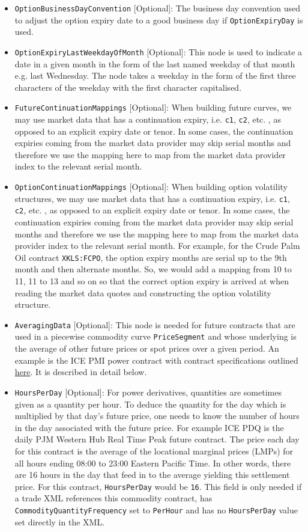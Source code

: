 \begin{itemize}
\item \lstinline!OptionBusinessDayConvention! [Optional]: The business day convention used to adjust the option expiry date to a good business day if \lstinline!OptionExpiryDay! is used.
\item \lstinline!OptionExpiryLastWeekdayOfMonth! [Optional]: This node is used to indicate a date in a given month in the form of the last named weekday of that month e.g. last Wednesday. The node takes a weekday in the form of the first three characters of the weekday with the first character capitalised.
\item \lstinline!FutureContinuationMappings! [Optional]: When building future curves, we may use market data that has a continuation expiry, i.e. \lstinline!c1!, \lstinline!c2!, etc. , as opposed to an explicit expiry date or tenor. In some cases, the continuation expiries coming from the market data provider may skip serial months and therefore we use the mapping here to map from the market data provider index to the relevant serial month.
\item \lstinline!OptionContinuationMappings! [Optional]: When building option volatility structures, we may use market data that has a continuation expiry, i.e. \lstinline!c1!, \lstinline!c2!, etc. , as opposed to an explicit expiry date or tenor. In some cases, the continuation expiries coming from the market data provider may skip serial months and therefore we use the mapping here to map from the market data provider index to the relevant serial month. For example, for the Crude Palm Oil contract \lstinline!XKLS:FCPO!, the option expiry months are serial up to the 9th month and then alternate months. So, we would add a mapping from 10 to 11, 11 to 13 and so on so that the correct option expiry is arrived at when reading the market data quotes and constructing the option volatility structure.
\item \lstinline!AveragingData! [Optional]: This node is needed for future contracts that are used in a piecewise commodity curve \lstinline!PriceSegment! and whose underlying is the average of other future prices or spot prices over a given period. An example is the ICE PMI power contract with contract specifications outlined \href{https://www.theice.com/products/6590369/PJM-Western-Hub-Real-Time-Peak-1-MW-Fixed-Price-Future}{here}. It is described in detail below.
\item \lstinline!HoursPerDay! [Optional]: For power derivatives, quantities are sometimes given as a quantity per hour. To deduce the quantity for the day which is multiplied by that day's future price, one needs to know the number of hours in the day associated with the future price. For example ICE PDQ is the daily PJM Western Hub Real Time Peak future contract. The price each day for this contract is the average of the locational marginal prices (LMPs) for all hours ending 08:00 to 23:00 Eastern Pacific Time. In other words, there are 16 hours in the day that feed in to the average yielding this settlement price. For this contract, \lstinline!HoursPerDay! would be \lstinline!16!. This field is only needed if a trade XML references this commodity contract, has \lstinline!CommodityQuantityFrequency! set to \lstinline!PerHour! and has no \lstinline!HoursPerDay! value set directly in the XML.

\end{itemize}
